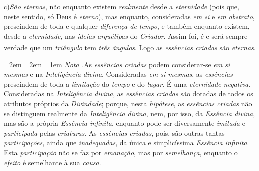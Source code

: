\documentclass[12pt,a4paper]{article}
\newcommand{\sub}[2]{\medskip\noindent#1)\quad\emph{#2},\;\textemdash\;}
\renewcommand\footnote[1]{%
    \stepcounter{footnote}\textsuperscript{\thefootnote}%
    \par
    {\footnotesize
     \leftskip=2em \rightskip=2em \parindent=1em
     \addvspace{\medskipamount}%
     \noindent\textit{Nota \thefootnote.}\enspace #1\par
     \addvspace{\medskipamount}}%
  }
\begin{document}
\sub{c}{São eternas} não enquanto existem \emph{realmente} desde a
\emph{eternidade} (pois que, neste sentido, só Deus é \emph{eterno}),
\textemdash{} mas enquanto, consideradas \emph{em si} e \emph{em abstrato},
prescindem de toda e qualquer \emph{diferença de tempo}, e também enquanto
existem, desde a \emph{eternidade}, nas \emph{ideias arquétipas} do
\emph{Criador}. Assim foi, é e será sempre verdade que um \emph{triângulo} tem
\emph{três ângulos}. Logo as \emph{essências criadas} são
\emph{eternas}.\footnote{As \emph{essências criadas} podem considerar-se
\emph{em si mesmas} e na \emph{Inteligência divina}. \textemdash{} Consideradas
\emph{em si mesmas}, as \emph{essências} prescindem de toda a \emph{limitação}
do \emph{tempo} e do \emph{lugar}. É uma \emph{eternidade negativa}.
\textemdash{} Consideradas na \emph{Inteligência divina}, as \emph{essências
criadas} são dotadas de todos os atributos próprios da \emph{Divindade};
porque, nesta \emph{hipótese}, as \emph{essências criadas} não se distinguem
realmente da \emph{Inteligência divina}, nem, por isso, da \emph{Essência
divina}, mas são a própria \emph{Essência infinita}, enquanto pode ser
diversamente \emph{imitada} e \emph{participada} pelas \emph{criaturas}. As
\emph{essências criadas}, pois, são outras tantas \emph{participações}, ainda
que \emph{inadequadas}, da única e simplicíssima \emph{Essência infinita}. Esta
\emph{participação} não se faz por \emph{emanação}, mas por \emph{semelhança},
enquanto o \emph{efeito} é semelhante à sua \emph{causa}.}
\end{document}
